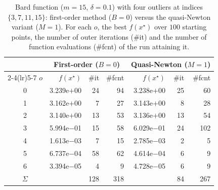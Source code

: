 \begin{table}[t]
  \centering
  \begin{tabular}{c rrr rrr}
    \toprule
      & \multicolumn{3}{c}{First-order ($B=0$)}
      & \multicolumn{3}{c}{Quasi-Newton ($M=1$)} \\
    \cmidrule(lr){2-4}\cmidrule(lr){5-7}
    $o$ & $f(x^\star)$ & \#it & \#fcnt & $f(x^\star)$ & \#it & \#fcnt \\
    \midrule
    0 & 3.239e$+$00 & 24 &  94 & 3.238e$+$00 & 25 &  60 \\
    1 & 3.162e$+$00 &  7 &  27 & 3.143e$+$00 &  8 &  28 \\
    2 & 3.140e$+$00 & 13 &  53 & 3.136e$+$00 & 13 &  54 \\
    3 & 5.994e$-$01 & 15 &  58 & 6.029e$-$01 & 24 & 102 \\
    4 & 1.613e$-$03 &  7 &  15 & 2.785e$-$03 &  2 &   5 \\
    5 & 6.737e$-$04 & 58 &  62 & 4.614e$-$04 &  6 &   9 \\
    6 & 3.394e$-$05 &  4 &   9 & 4.728e$-$05 &  6 &   9 \\
    \midrule
    $\Sigma$ & & 128 & 318 & & 84 & 267 \\
    \bottomrule
  \end{tabular}
  \caption{Bard function ($m=15$, $\delta=0.1$) with four outliers at indices
  $\{3,7,11,15\}$: first-order method ($B=0$) versus the quasi-Newton variant
  ($M=1$). For each $o$, the best $f(x^\star)$ over $100$ starting points, the
  number of outer iterations (\#it) and the number of function evaluations
  (\#fcnt) of the run attaining it.}
  \label{tab:bard}
\end{table}
